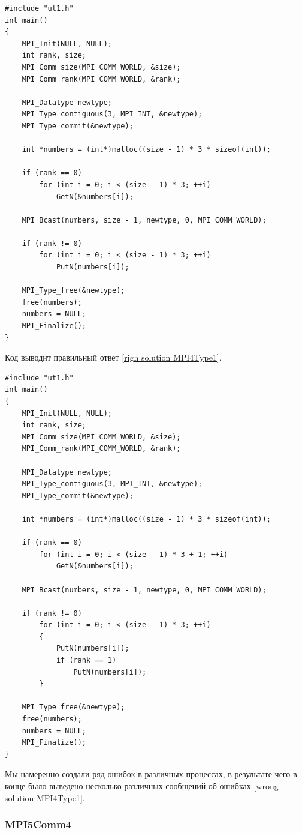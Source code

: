 \lstset{language=c++}
\begin{lstlisting}
#include "ut1.h"
int main()
{
	MPI_Init(NULL, NULL);
	int rank, size;
	MPI_Comm_size(MPI_COMM_WORLD, &size);
	MPI_Comm_rank(MPI_COMM_WORLD, &rank);

	MPI_Datatype newtype;
	MPI_Type_contiguous(3, MPI_INT, &newtype);
	MPI_Type_commit(&newtype);

	int *numbers = (int*)malloc((size - 1) * 3 * sizeof(int));

	if (rank == 0)
		for (int i = 0; i < (size - 1) * 3; ++i)
			GetN(&numbers[i]);

	MPI_Bcast(numbers, size - 1, newtype, 0, MPI_COMM_WORLD);

	if (rank != 0)
		for (int i = 0; i < (size - 1) * 3; ++i)
			PutN(numbers[i]);

	MPI_Type_free(&newtype);
	free(numbers);
	numbers = NULL;
	MPI_Finalize();
}
\end{lstlisting}

Код выводит правильный ответ \ref{righ solution MPI4Type1}.

\lstset{language=c++}
\begin{lstlisting}
#include "ut1.h"
int main()
{
	MPI_Init(NULL, NULL);
	int rank, size;
	MPI_Comm_size(MPI_COMM_WORLD, &size);
	MPI_Comm_rank(MPI_COMM_WORLD, &rank);

	MPI_Datatype newtype;
	MPI_Type_contiguous(3, MPI_INT, &newtype);
	MPI_Type_commit(&newtype);

	int *numbers = (int*)malloc((size - 1) * 3 * sizeof(int));

	if (rank == 0)
		for (int i = 0; i < (size - 1) * 3 + 1; ++i)
			GetN(&numbers[i]);

	MPI_Bcast(numbers, size - 1, newtype, 0, MPI_COMM_WORLD);

	if (rank != 0)
		for (int i = 0; i < (size - 1) * 3; ++i)
		{
			PutN(numbers[i]);
			if (rank == 1)
				PutN(numbers[i]);
		}

	MPI_Type_free(&newtype);
	free(numbers);
	numbers = NULL;
	MPI_Finalize();
}
\end{lstlisting}

Мы намеренно создали ряд ошибок в различных процессах, в результате чего в конце было выведено несколько различных сообщений об ошибках \ref{wrong solution MPI4Type1}.

\newpage

\subsubsection{MPI5Comm4}

